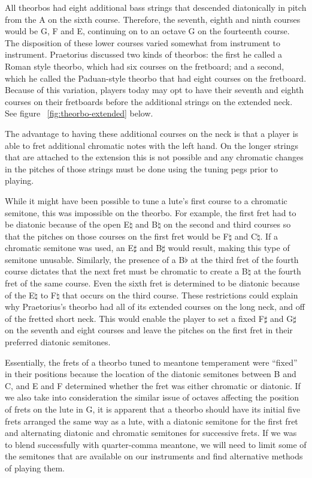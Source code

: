 All theorbos had eight additional bass strings that descended diatonically in
pitch from the A on the sixth course.  Therefore, the seventh, eighth and ninth
courses would be G, F and E, continuing on to an octave G on the fourteenth
course.  The disposition of these lower courses varied somewhat from instrument
to instrument.  Praetorius discussed two kinds of theorbos: the first he called
a Roman style theorbo, which had six courses on the fretboard; and a second,
which he called the Paduan-style theorbo that had eight courses on the
fretboard. \autocite[59]{MP:1}  Because of this variation, players today may
opt to have their seventh and eighth courses on their fretboards before the
additional strings on the extended neck. See figure ~\ref{fig:theorbo-extended}
below.

The advantage to having these additional courses on the neck is that a player is
able to fret additional chromatic notes with the left hand.  On the longer
strings that are attached to the extension this is not possible and any
chromatic changes in the pitches of those strings must be done using the tuning
pegs prior to playing.

While it might have been possible to tune a lute's first course to a chromatic semitone,
this was impossible on the theorbo. For example, the first fret had to be diatonic because
of the open E$\natural$ and B$\natural$ on the second and third courses so that the
pitches on those courses on the first fret would be F$\natural$ and C$\natural$.  If a
chromatic semitone was used, an E$\sharp$ and B$\sharp$ would result, making this type of
semitone unusable. Similarly, the presence of a B$\flat$ at the third fret of the fourth
course dictates that the next fret must be chromatic to create a B$\natural$ at the fourth
fret of the same course. Even the sixth fret is determined to be diatonic because of the
E$\natural$ to F$\natural$ that occurs on the third course.  These restrictions could
explain why Praetorius's theorbo had all of its extended courses on the long neck, and
off of the fretted short neck.  This would enable the player to set a fixed F$\sharp$ and 
G$\sharp$ on the seventh and eight courses and leave the pitches on the first fret in
their preferred diatonic semitones. 

Essentially, the frets of a theorbo tuned to meantone temperament were ``fixed'' in their positions
because the location of the diatonic semitones between B and C, and E and F determined whether the
fret was either chromatic or diatonic.  If we also take into consideration the similar issue of
octaves affecting the position of frets on the lute in G, it is apparent that a theorbo should have
its initial five frets arranged the same way as a lute, with a diatonic semitone for the first fret
and alternating diatonic and chromatic semitones for successive frets.  If we was to blend
successfully with quarter-comma meantone, we will need to limit some of the semitones that are
available on our instruments and find alternative methods of playing them.

